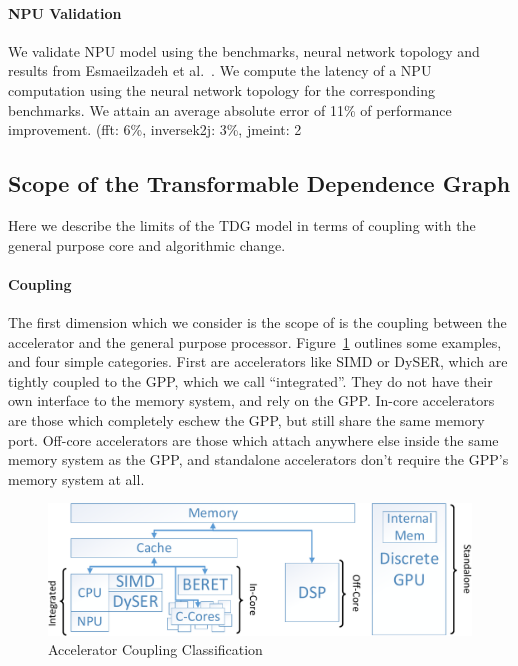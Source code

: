 \paragraph{NPU Validation}
We validate NPU model using the benchmarks, neural network topology
and results from Esmaeilzadeh et al.~\cite{npu}. We compute
the latency of a NPU computation using the neural network topology for
the corresponding benchmarks. We attain an average
absolute error of 11\% of performance improvement. (fft: 6\%,
inversek2j: 3\%, jmeint: 2%
\fi


\subsection{Scope of the Transformable Dependence Graph} \label{sec:scope}
Here we describe the limits of the TDG model in terms of coupling with the
general purpose core and algorithmic change.

\paragraph{Coupling}
The first dimension which we consider is the scope of is the coupling between
the accelerator and the general purpose processor.  Figure~\ref{fig:coupling}
outlines some examples, and four simple categories.  First are accelerators
like SIMD or DySER, which are tightly coupled to the GPP, which we call
``integrated''.  They do not have their own interface to the memory system, and
rely on the GPP.  In-core accelerators are those which completely eschew the
GPP, but still share the same memory port.  Off-core accelerators are those
which attach anywhere else inside the same memory system as the GPP, and
standalone accelerators don't require the GPP's memory system at all.

\begin{figure}[t]
\begin{center}
\includegraphics[width=0.7\linewidth]{figs/arch-scope.pdf}
\end{center}
\caption{Accelerator Coupling Classification}
\label{fig:coupling}
\end{figure}

